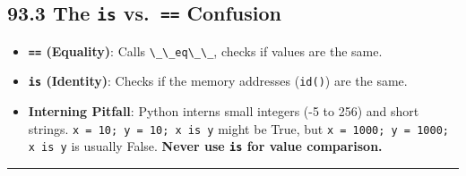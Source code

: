 \hypertarget{the-is-vs.-confusion}{%
\subsection{\texorpdfstring{93.3 The \texttt{is} vs.~\texttt{==}
Confusion}{93.3 The is vs.~== Confusion}}\label{the-is-vs.-confusion}}

\begin{itemize}
\tightlist
\item
  \textbf{\passthrough{\lstinline!==!} (Equality)}: Calls
  \passthrough{\lstinline!\_\_eq\_\_!}, checks if values are the same.
\item
  \textbf{\passthrough{\lstinline!is!} (Identity)}: Checks if the memory
  addresses (\passthrough{\lstinline!id()!}) are the same.
\item
  \textbf{Interning Pitfall}: Python interns small integers (-5 to 256)
  and short strings. \passthrough{\lstinline!x = 10; y = 10; x is y!}
  might be True, but
  \passthrough{\lstinline!x = 1000; y = 1000; x is y!} is usually False.
  \textbf{Never use \passthrough{\lstinline!is!} for value comparison.}
\end{itemize}

\begin{center}\rule{0.5\linewidth}{0.5pt}\end{center}
